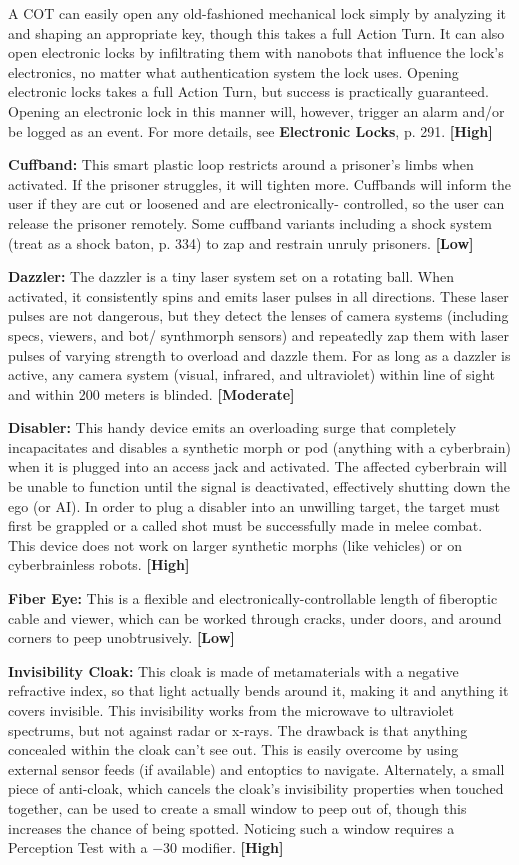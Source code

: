 A COT can easily open any old-fashioned mechanical lock simply by analyzing it and shaping an appropriate key, though this takes a full Action Turn. It can also open electronic locks by infiltrating them with nanobots that influence the lock’s electronics, no matter what authentication system the lock uses. Opening electronic locks takes a full Action Turn, but success is practically guaranteed. Opening an electronic lock in this manner will, however, trigger an alarm and/or be logged as an event. For more details, see \textbf{Electronic Locks}, p. 291. \textbf{[High]} 

\textbf{Cuffband:} This smart plastic loop restricts around a prisoner’s limbs when activated. If the prisoner struggles, it will tighten more. Cuffbands will inform the user if they are cut or loosened and are electronically- controlled, so the user can release the prisoner remotely. Some cuffband variants including a shock system (treat as a shock baton, p. 334) to zap and restrain unruly prisoners. \textbf{[Low]} 

\textbf{Dazzler:} The dazzler is a tiny laser system set on a rotating ball. When activated, it consistently spins and emits laser pulses in all directions. These laser pulses are not dangerous, but they detect the lenses of camera systems (including specs, viewers, and bot/ synthmorph sensors) and repeatedly zap them with laser pulses of varying strength to overload and dazzle them. For as long as a dazzler is active, any camera system (visual, infrared, and ultraviolet) within line of sight and within 200 meters is blinded. \textbf{[Moderate]} 

\textbf{Disabler:} This handy device emits an overloading surge that completely incapacitates and disables a synthetic morph or pod (anything with a cyberbrain) when it is plugged into an access jack and activated. The affected cyberbrain will be unable to function until the signal is deactivated, effectively shutting down the ego (or AI). In order to plug a disabler into an unwilling target, the target must first be grappled or a called shot must be successfully made in melee combat. This device does not work on larger synthetic morphs (like vehicles) or on cyberbrainless robots. \textbf{[High]} 

\textbf{Fiber Eye:} This is a flexible and electronically-controllable length of fiberoptic cable and viewer, which can be worked through cracks, under doors, and around corners to peep unobtrusively. \textbf{[Low]} 

\textbf{Invisibility Cloak:} This cloak is made of metamaterials with a negative refractive index, so that light actually bends around it, making it and anything it covers invisible. This invisibility works from the microwave to ultraviolet spectrums, but not against radar or x-rays. The drawback is that anything concealed within the cloak can’t see out. This is easily overcome by using external sensor feeds (if available) and entoptics to navigate. Alternately, a small piece of anti-cloak, which cancels the cloak’s invisibility properties when touched together, can be used to create a small window to peep out of, though this increases the chance of being spotted. Noticing such a window requires a Perception Test with a $-$30 modifier. \textbf{[High]} 

